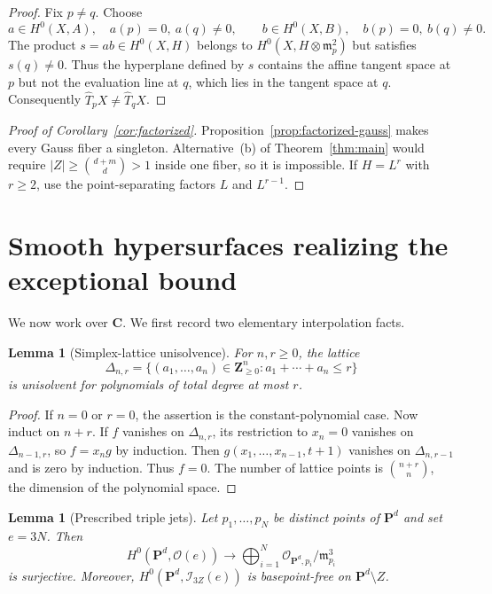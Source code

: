 \documentclass[11pt]{article}
\newtheorem{lemma}[theorem]{Lemma}
\newcommand{\PP}{\mathbf P}
\newcommand{\CC}{\mathbf C}
\newcommand{\cO}{\mathcal O}
\begin{document}
\begin{proof}
Fix $p\neq q$.  Choose
\[
 a\in H^0(X,A),\quad a(p)=0,\ a(q)\neq0,
 \qquad
 b\in H^0(X,B),\quad b(p)=0,\ b(q)\neq0.
\]
The product $s=ab\in H^0(X,H)$ belongs to
$H^0(X,H\otimes\mathfrak m_p^2)$ but satisfies $s(q)\neq0$.  Thus the
hyperplane defined by $s$ contains the affine tangent space at $p$ but not
the evaluation line at $q$, which lies in the tangent space at $q$.
Consequently $\widehat T_pX\neq\widehat T_qX$.
\end{proof}

\begin{proof}[Proof of Corollary~\ref{cor:factorized}]
Proposition~\ref{prop:factorized-gauss} makes every Gauss fiber a singleton.
Alternative~(b) of Theorem~\ref{thm:main} would require
$|Z|\geq\binom{d+m}{d}>1$ inside one fiber, so it is impossible.  If
$H=L^r$ with $r\geq2$, use the point-separating factors $L$ and $L^{r-1}$.
\end{proof}

\section{Smooth hypersurfaces realizing the exceptional bound}

We now work over $\CC$.  We first record two elementary interpolation facts.

\begin{lemma}[Simplex-lattice unisolvence]\label{lem:simplex}
For $n,r\geq0$, the lattice
\[
 \Delta_{n,r}=\{(a_1,\ldots,a_n)\in\mathbf Z_{\geq0}^n:
                         a_1+\cdots+a_n\leq r\}
\]
is unisolvent for polynomials of total degree at most $r$.
\end{lemma}

\begin{proof}
If $n=0$ or $r=0$, the assertion is the constant-polynomial case.  Now induct
on $n+r$.  If $f$ vanishes on $\Delta_{n,r}$, its restriction to
$x_n=0$ vanishes on $\Delta_{n-1,r}$, so $f=x_ng$ by induction.  Then
$g(x_1,\ldots,x_{n-1},t+1)$ vanishes on $\Delta_{n,r-1}$ and is zero by
induction.  Thus $f=0$.  The number of lattice points is
$\binom{n+r}{n}$, the dimension of the polynomial space.
\end{proof}

\begin{lemma}[Prescribed triple jets]\label{lem:triple-jets}
Let $p_1,\ldots,p_N$ be distinct points of $\PP^d$ and set $e=3N$.  Then
\[
 H^0(\PP^d,\cO(e))\longrightarrow
 \bigoplus_{i=1}^N\cO_{\PP^d,p_i}/\mathfrak m_{p_i}^3
\]
is surjective.  Moreover, $H^0(\PP^d,\mathcal I_{3Z}(e))$ is basepoint-free
on $\PP^d\setminus Z$.
\end{lemma}
\end{document}
